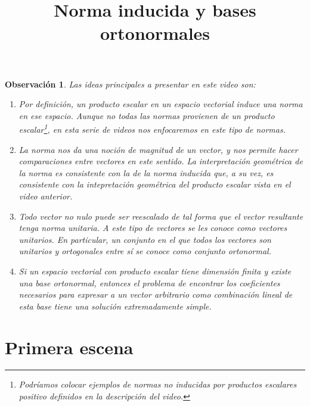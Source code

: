 \documentclass[12pt,dvipsnames]{article}
\newtheorem{obs}{Observación}[section]
\numberwithin{equation}{section}
\begin{document}
\title{Norma inducida y bases ortonormales}
\date{}
\maketitle

\begin{obs}
    Las ideas principales a presentar en este video son:

    \begin{enumerate}[label=(\roman*)]
        \item Por definición, un producto escalar en un espacio vectorial induce una norma en ese espacio. Aunque no todas las normas provienen de un producto escalar\footnote{Podríamos colocar ejemplos de normas no inducidas por productos escalares positivo definidos en la descripción del video.}, en esta serie de videos nos enfocaremos en este tipo de normas.

        \item La norma nos da una noción de \emph{magnitud} de un vector, y nos permite hacer comparaciones entre vectores en este sentido. La interpretación geométrica de la norma es consistente con la de la norma inducida que, a su vez, es consistente con la intepretación geométrica del producto escalar vista en el video anterior.

        \item Todo vector no nulo puede ser reescalado de tal forma que el vector resultante tenga norma unitaria. A este tipo de vectores se les conoce como vectores unitarios. En particular, un conjunto en el que todos los vectores son unitarios y ortogonales entre sí se conoce como conjunto ortonormal.

        \item Si un espacio vectorial con producto escalar tiene dimensión finita y existe una base ortonormal, entonces el problema de encontrar los coeficientes necesarios para expresar a un vector arbitrario como combinación lineal de esta base tiene una solución extremadamente simple.
    \end{enumerate}
\end{obs}


\newpage
\section{Primera escena}
\end{document}
